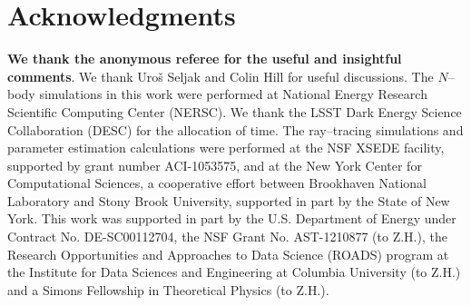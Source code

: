 \documentclass[reprint,aps,prd,superscriptaddress,showkeys,showpacs]{revtex4-1}
\begin{document}
\section*{Acknowledgments}
\textbf{\color{ForestGreen} We thank the anonymous referee for the useful and insightful comments}. We thank Uro\v{s} Seljak and Colin Hill for useful discussions. The $N$--body simulations in this work were performed at National Energy Research Scientific Computing Center (NERSC). We thank the LSST Dark Energy Science Collaboration (DESC) for the allocation of time. The ray--tracing simulations and parameter estimation calculations were performed at the NSF XSEDE facility, supported by grant number ACI-1053575, and at the New York Center for Computational Sciences, a cooperative effort between Brookhaven National Laboratory and Stony Brook University, supported in part by the State of New York. This work was supported in part by the U.S. Department of Energy under Contract No. DE-SC00112704, the NSF Grant No. AST-1210877 (to Z.H.), the Research Opportunities and Approaches to Data Science (ROADS) program at the Institute for Data Sciences and Engineering at Columbia University (to Z.H.) and a Simons Fellowship in Theoretical Physics (to Z.H.).




\label{lastpage}
\end{document}
